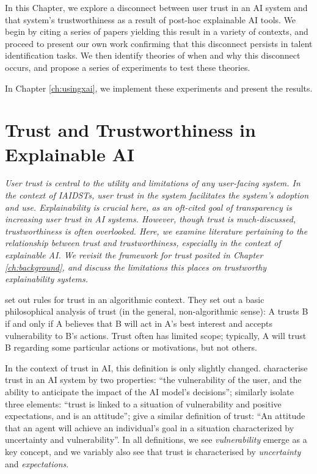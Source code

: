 In this Chapter, we explore a disconnect between user trust in an AI system and that system's trustworthiness as a result of post-hoc explainable AI tools. We begin by citing a series of papers yielding this result in a variety of contexts, and proceed to present our own work confirming that this disconnect persists in talent identification tasks. We then identify theories of when and why this disconnect occurs, and propose a series of experiments to test these theories. 

In Chapter \ref{ch:usingxai}, we implement these experiments and present the results.

\section{Trust and Trustworthiness in Explainable AI}
\emph{User trust is central to the utility and limitations of any user-facing system. In the context of IAIDSTs, user trust in the system facilitates the system's adoption and use. Explainability is crucial here, as an oft-cited goal of transparency is increasing user trust in AI systems. However, though trust is much-discussed, trustworthiness is often overlooked. Here, we examine literature pertaining to the relationship between trust and trustworthiness, especially in the context of explainable AI. We revisit the framework for trust posited in Chapter \ref{ch:background}, and discuss the limitations this places on trustworthy explainability systems.}

\textcite{jacovi_formalizing_2021} set out rules for trust in an algorithmic context. They set out a basic philosophical analysis of trust (in the general, non-algorithmic sense): A trusts B if and only if A believes that B will act in A's best interest and accepts vulnerability to B's actions. Trust often has limited scope; typically, A will trust B regarding some particular actions or motivations, but not others.

In the context of trust in AI, this definition is only slightly changed. \textcite{jacovi_formalizing_2021} characterise trust in an AI system by two properties: ``the vulnerability of the user, and the ability to anticipate the impact of the AI model's decisions''; \textcite{vereschak_how_2021} similarly isolate three elements: ``trust is linked to a situation of vulnerability and positive expectations, and is an attitude''; \textcite{lee_trust_2004} give a similar definition of trust: ``An attitude that an agent will achieve an individual's goal in a situation characterized by uncertainty and vulnerability''. In all definitions, we see \emph{vulnerability} emerge as a key concept, and we variably also see that trust is characterised by \emph{uncertainty} and \emph{expectations}.

